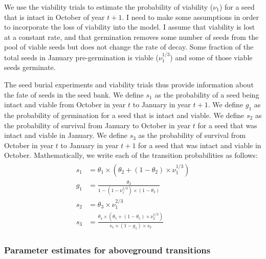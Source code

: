 \documentclass[12pt, oneside, titlepage]{article}   	%
\begin{document}

We use the viability trials to estimate the probability of viability ($\nu_1$) for a seed that is intact in October of year $t+1$. I need to make some assumptions in order to incorporate the loss of viability into the model. I assume that viability is lost at a constant rate, and that germination removes some number of seeds from the pool of viable seeds but does not change the rate of decay. Some fraction of the total seeds in January pre-germination is viable ($\nu_1^{1/3}$) and some of those viable seeds germinate. 

The seed burial experiments and viability trials thus provide information about the fate of seeds in the seed bank. We define $s_1$ as the probability of a seed being intact and viable from October in year $t$ to January in year $t+1$. We define $g_1$ as the probability of germination for a seed that is intact and viable. We define $s_2$ as the probability of survival from January to October in year $t$ for a seed that was intact and viable in January. We define $s_3$ as the probability of survival from October in year $t$ to January in year $t+1$ for a seed that was intact and viable in October. Mathematically, we write each of the transition probabilities as follows:
%
    \begin{align}
\begin{split}
s_1 & = \theta_1 \times (\theta_2 + ( 1- \theta_2 ) \times \nu_1^{1/3} ) \\
g_1 & = \frac{\theta_2 }{1 - ( 1-  \nu_1^{1/3} ) \times ( 1 - \theta_2 )} \\
s_2 & = \theta_3 \times \nu_1^{2/3} \\
s_3 & = \frac{\theta_4 \times (\theta_5 + ( 1- \theta_5 ) \times \nu_2^{1/3} )}{s_1 \times (1-g_1) \times s_2 }
  \end{split}
\end{align}
%

\subsubsection*{Parameter estimates for aboveground transitions}
\end{document}

